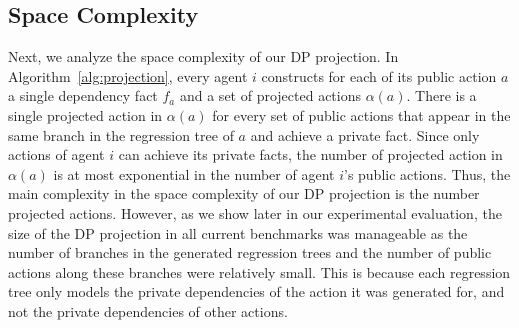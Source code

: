 \documentclass[letterpaper]{article}
\theoremstyle{definition}
\begin{document}
\subsection{Space Complexity}
Next, we analyze the space complexity of our DP projection. 
In Algorithm~\ref{alg:projection}, every agent $i$ constructs for each of its public action $a$ a single dependency fact $f_a$ and  a set of projected actions $\alpha(a)$. There is a single projected action in $\alpha(a)$ for every set of public actions that appear in the same branch in the regression tree of $a$ and achieve a private fact. Since only actions of agent $i$ can achieve its private facts, the number of projected action in $\alpha(a)$ is at most exponential in the number of agent $i$'s public actions. 
Thus, the main complexity in the space complexity of our DP projection is the number projected actions. %
However, as we show later in our experimental evaluation, the size of the DP projection in all current benchmarks was manageable as the number of branches in the generated regression trees and the number of public actions along these branches were relatively small. This is because each regression tree only models the private dependencies of the action it was generated for, and not  the private dependencies of other actions.  






\end{document}
